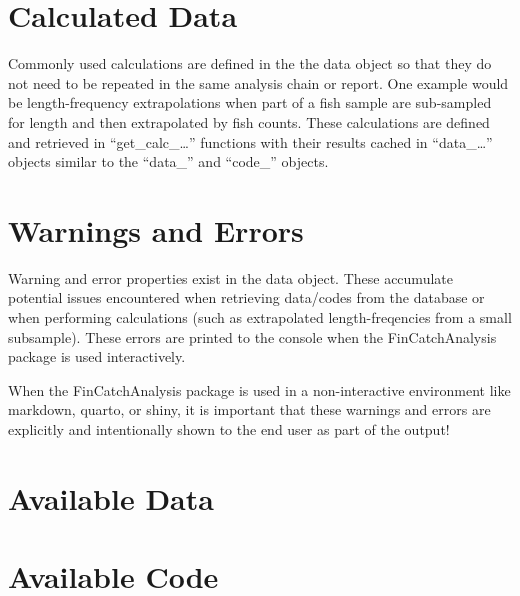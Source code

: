 \documentclass[
  letterpaper,
  DIV=11,
  numbers=noendperiod]{scrreprt}
\begin{document}
\section{Calculated Data}\label{calculated-data}

Commonly used calculations are defined in the the data object so that
they do not need to be repeated in the same analysis chain or report.
One example would be length-frequency extrapolations when part of a fish
sample are sub-sampled for length and then extrapolated by fish counts.
These calculations are defined and retrieved in ``get\_calc\_\ldots{}''
functions with their results cached in ``data\_\ldots{}'' objects
similar to the ``data\_'' and ``code\_'' objects.

\section{Warnings and Errors}\label{warnings-and-errors}

Warning and error properties exist in the data object. These accumulate
potential issues encountered when retrieving data/codes from the
database or when performing calculations (such as extrapolated
length-freqencies from a small subsample). These errors are printed to
the console when the FinCatchAnalysis package is used interactively.

\begin{tcolorbox}[enhanced jigsaw, leftrule=.75mm, coltitle=black, colbacktitle=quarto-callout-important-color!10!white, colframe=quarto-callout-important-color-frame, opacitybacktitle=0.6, rightrule=.15mm, colback=white, bottomtitle=1mm, toptitle=1mm, titlerule=0mm, breakable, bottomrule=.15mm, toprule=.15mm, title=\textcolor{quarto-callout-important-color}{\faExclamation}\hspace{0.5em}{Important}, arc=.35mm, opacityback=0, left=2mm]

When the FinCatchAnalysis package is used in a non-interactive
environment like markdown, quarto, or shiny, it is important that these
warnings and errors are explicitly and intentionally shown to the end
user as part of the output!

\end{tcolorbox}

\section{Available Data}\label{available-data}

\section{Available Code}\label{available-code}
\end{document}
